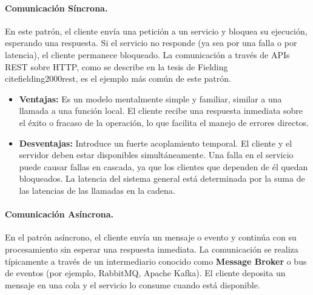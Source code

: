 \paragraph{Comunicación Síncrona.}
En este patrón, el cliente envía una petición a un servicio y bloquea su ejecución, esperando una respuesta. Si el servicio no responde (ya sea por una falla o por latencia), el cliente permanece bloqueado. La comunicación a través de APIs REST sobre HTTP, como se describe en la tesis de Fielding \\cite{fielding2000rest}, es el ejemplo más común de este patrón.

\begin{itemize}
    \item \textbf{Ventajas:} Es un modelo mentalmente simple y familiar, similar a una llamada a una función local. El cliente recibe una respuesta inmediata sobre el éxito o fracaso de la operación, lo que facilita el manejo de errores directos.
    \item \textbf{Desventajas:} Introduce un fuerte acoplamiento temporal. El cliente y el servidor deben estar disponibles simultáneamente. Una falla en el servicio puede causar fallas en cascada, ya que los clientes que dependen de él quedan bloqueados. La latencia del sistema general está determinada por la suma de las latencias de las llamadas en la cadena.
\end{itemize}

\paragraph{Comunicación Asíncrona.}
En el patrón asíncrono, el cliente envía un mensaje o evento y continúa con su procesamiento sin esperar una respuesta inmediata. La comunicación se realiza típicamente a través de un intermediario conocido como \textbf{Message Broker} o bus de eventos (por ejemplo, RabbitMQ, Apache Kafka). El cliente deposita un mensaje en una cola y el servicio lo consume cuando está disponible.

